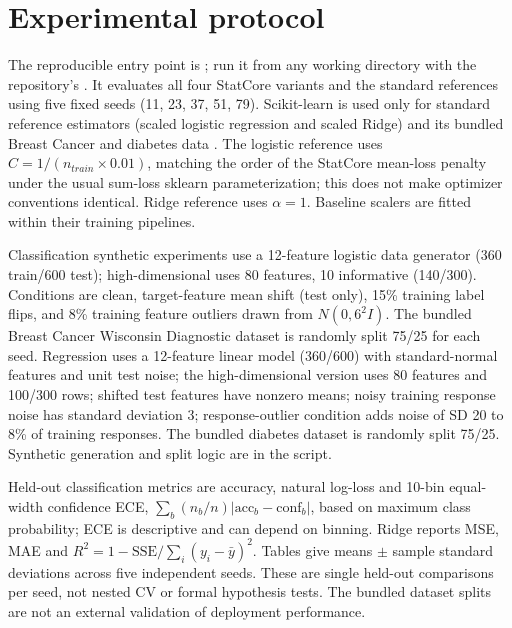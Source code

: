 \documentclass[conference]{IEEEtran}
\begin{document}
\section{Experimental protocol}
The reproducible entry point is ; run it from any working directory with the repository's . It evaluates all four StatCore variants and the standard references using five fixed seeds (11, 23, 37, 51, 79). Scikit-learn is used only for standard reference estimators (scaled logistic regression and scaled Ridge) and its bundled Breast Cancer and diabetes data \cite{pedregosa2011}. The logistic reference uses \(C=1/(n_{train}\times0.01)\), matching the order of the StatCore mean-loss penalty under the usual sum-loss sklearn parameterization; this does not make optimizer conventions identical. Ridge reference uses \(\alpha=1\). Baseline scalers are fitted within their training pipelines.

Classification synthetic experiments use a 12-feature logistic data generator (360 train/600 test); high-dimensional uses 80 features, 10 informative (140/300). Conditions are clean, target-feature mean shift (test only), 15\% training label flips, and 8\% training feature outliers drawn from \(N(0,6^2I)\). The bundled Breast Cancer Wisconsin Diagnostic dataset is randomly split 75/25 for each seed. Regression uses a 12-feature linear model (360/600) with standard-normal features and unit test noise; the high-dimensional version uses 80 features and 100/300 rows; shifted test features have nonzero means; noisy training response noise has standard deviation 3; response-outlier condition adds noise of SD 20 to 8\% of training responses. The bundled diabetes dataset is randomly split 75/25. Synthetic generation and split logic are in the script.

Held-out classification metrics are accuracy, natural log-loss and 10-bin equal-width confidence ECE, \(\sum_b(n_b/n)|\mathrm{acc}_b-\mathrm{conf}_b|\), based on maximum class probability; ECE is descriptive and can depend on binning. Ridge reports MSE, MAE and \(R^2=1-\mathrm{SSE}/\sum_i(y_i-\bar y)^2\). Tables give means \(\pm\) sample standard deviations across five independent seeds. These are single held-out comparisons per seed, not nested CV or formal hypothesis tests. The bundled dataset splits are not an external validation of deployment performance.
\end{document}
